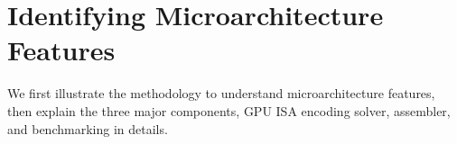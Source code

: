 \section{Identifying Microarchitecture Features}
\label{sec:assembler}

We first illustrate the methodology to understand microarchitecture features, then explain the three major components, GPU ISA encoding solver, assembler, and benchmarking in details.





